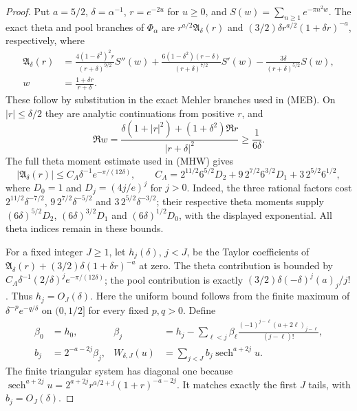 \documentclass[11pt]{article}
\theoremstyle{remark}\newtheorem{remark}[theorem]{Remark}
\begin{document}
\begin{proof}
Put $a=5/2$, $\delta=\alpha^{-1}$, $r=e^{-2u}$ for $u\ge0$,
and $S(w)=\sum_{n\ge1}e^{-\pi n^2w}$.
The exact theta and pool branches of $\Phi_\alpha$ are
$r^{a/2}\mathfrak A_\delta(r)$ and
$(3/2)\delta r^{a/2}(1+\delta r)^{-a}$, respectively, where
\[
 \begin{split}
 \mathfrak A_\delta(r)&=
 \frac{4(1-\delta^2)^2r}{(r+\delta)^{9/2}}S''(w)
 +\frac{6(1-\delta^2)(r-\delta)}{(r+\delta)^{7/2}}S'(w)
 -\frac{3\delta}{(r+\delta)^{5/2}}S(w),\\
 w&=\frac{1+\delta r}{r+\delta}.
 \end{split}                                                   \tag{TM2}
\]
These follow by substitution in the exact Mehler branches used
in (MEB). On $|r|\le\delta/2$ they are analytic continuations
from positive $r$, and
\[
 \Re w=\frac{\delta(1+|r|^2)+(1+\delta^2)\Re r}
                         {|r+\delta|^2}\ge\frac1{6\delta}.
\]
The full theta moment estimate used in (MHW) gives
\[
 |\mathfrak A_\delta(r)|
 \le C_A\delta^{-1}e^{-\pi/(12\delta)},\qquad
 C_A=2^{11/2}6^{5/2}D_2+
            9\,2^{7/2}6^{3/2}D_1+3\,2^{5/2}6^{1/2},     \tag{TM3}
\]
where $D_0=1$ and $D_j=(4j/e)^j$ for $j>0$.
Indeed, the three rational factors cost
$2^{11/2}\delta^{-7/2}$, $9\,2^{7/2}\delta^{-5/2}$
and $3\,2^{5/2}\delta^{-3/2}$; their respective theta moments
supply $(6\delta)^{5/2}D_2$, $(6\delta)^{3/2}D_1$ and
$(6\delta)^{1/2}D_0$, with the displayed exponential.
All theta indices remain in these bounds.

For a fixed integer $J\ge1$, let $h_j(\delta)$, $j<J$, be the
Taylor coefficients of
$\mathfrak A_\delta(r)+(3/2)\delta(1+\delta r)^{-a}$ at zero.
The theta contribution is bounded by
$C_A\delta^{-1}(2/\delta)^j e^{-\pi/(12\delta)}$;
the pool contribution is exactly
$(3/2)\delta(-\delta)^j(a)_j/j!$.
Thus $h_j=O_J(\delta)$. Here the uniform bound follows from
the finite maximum of $\delta^{-p}e^{-q/\delta}$ on $(0,1/2]$
for every fixed $p,q>0$.
Define
\[
 \begin{aligned}
 \beta_0&=h_0,&
 \beta_j&=h_j-\sum_{\ell<j}\beta_\ell
           \frac{(-1)^{j-\ell}(a+2\ell)_{j-\ell}}{(j-\ell)!},\\
 b_j&=2^{-a-2j}\beta_j,&
 W_{\delta,J}(u)&=\sum_{j<J}b_j\operatorname{sech}^{a+2j}u .
 \end{aligned}                                          \tag{TM4}
\]
The finite triangular system has diagonal one because
$\operatorname{sech}^{a+2j}u
 =2^{a+2j}r^{a/2+j}(1+r)^{-a-2j}$.
It matches exactly the first $J$ tails, with $b_j=O_J(\delta)$.


\end{proof}
\end{document}
